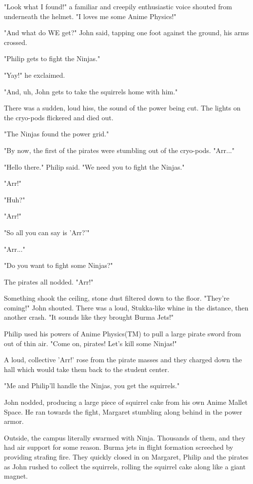 \documentclass[10pt]{article}
\begin{document}
"Look what I found!" a familiar and creepily enthusiastic voice shouted from underneath the helmet. "I loves me some Anime Physics!"

"And what do WE get?" John said, tapping one foot against the ground, his arms crossed.

"Philip gets to fight the Ninjas."

"Yay!" he exclaimed.

"And, uh, John gets to take the squirrels home with him."

There was a sudden, loud hiss, the sound of the power being cut. The lights on the cryo-pods flickered and died out.

"The Ninjas found the power grid."

"By now, the first of the pirates were stumbling out of the cryo-pods. "Arr..."

"Hello there." Philip said. "We need you to fight the Ninjas."

"Arr!"

"Huh?"

"Arr!"

"So all you can say is 'Arr?'"

"Arr..."

"Do you want to fight some Ninjas?"

The pirates all nodded. "Arr!"

Something shook the ceiling, stone dust filtered down to the floor. "They're coming!" John shouted. There was a loud, Stukka-like whine in the distance, then another crash. "It sounds like they brought Burma Jets!"

Philip used his powers of Anime Physics(TM) to pull a large pirate sword from out of thin air. "Come on, pirates! Let's kill some Ninjas!"

A loud, collective 'Arr!' rose from the pirate masses and they charged down the hall which would take them back to the student center.

"Me and Philip'll handle the Ninjas, you get the squirrels."

John nodded, producing a large piece of squirrel cake from his own Anime Mallet Space. He ran towards the fight, Margaret stumbling along behind in the power armor.

Outside, the campus literally swarmed with Ninja. Thousands of them, and they had air support for some reason. Burma jets in flight formation screeched by providing strafing fire. They quickly closed in on Margaret, Philip and the pirates as John rushed to collect the squirrels, rolling the squirrel cake along like a giant magnet.
\end{document}
